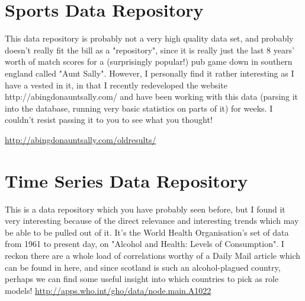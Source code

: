 %
%
% 
%
\setcounter{page}{1}
\section{Sports Data Repository}
	This data repository is probably not a very high quality data set, and probably doesn't really fit the bill as a "repository", since it is really just the last 8 years' worth of match scores for a (surprisingly popular!) pub game down in southern england called "Aunt Sally". However, I personally find it rather interesting as I have a vested in it, in that I recently redeveloped the website http://abingdonauntsally.com/ and have been working with this data (parsing it into the database, running very basic statistics on parts of it) for weeks. I couldn't resist passing it to you to see what you thought!
	
	\url{http://abingdonauntsally.com/oldresults/}

\section{Time Series Data Repository}
	This is a data repository which you have probably seen before, but I found it very interesting because of the direct relevance and interesting trends which may be able to be pulled out of it. It's the World Health Organisation's set of data from 1961 to present day, on "Alcohol and Health: Levels of Consumption". I reckon there are a whole load of correlations worthy of a Daily Mail article which can be found in here, and since scotland is such an alcohol-plagued country, perhaps we can find some useful insight into which countries to pick as role models! 
	\url{http://apps.who.int/gho/data/node.main.A1022}
	
